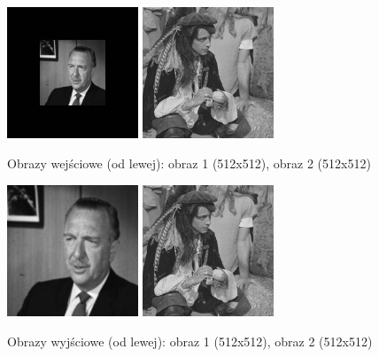 \documentclass[final,a4paper,openany,12pt]{mwbk}
\begin{document}
\begin{figure}[H]
	\begin{center}
		\includegraphics[width=0.35\textwidth]{gentelman_gray_unificationGeo_result}
		\includegraphics[width=0.35\textwidth]{pirate_gray_unificationGeo_result}
	\end{center}
	\caption{Obrazy wejściowe (od lewej): obraz 1 (512x512), obraz 2 (512x512)}
\end{figure}

\begin{figure}[H]
	\begin{center}
		\includegraphics[width=0.35\textwidth]{gentelman_gray_unificationRas_result}
		\includegraphics[width=0.35\textwidth]{pirate_gray_unificationRas_result}
	\end{center}
	\caption{Obrazy wyjściowe (od lewej): obraz 1 (512x512), obraz 2 (512x512)}
\end{figure}
\end{document}

